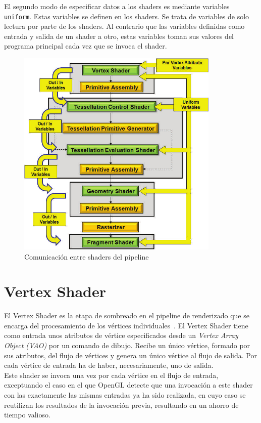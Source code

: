 El segundo modo de especificar datos a los shaders es mediante variables
\verb|uniform|. Estas variables se definen en los shaders. Se trata de variables
de solo lectura por parte de los shaders. Al contrario que las variables
definidas como entrada y salida de un shader a otro, estas variables toman sus
valores del programa principal cada vez que se invoca el shader.  \\

\begin{figure}
		\centering
		\includegraphics[height=10cm]{figures/variablespipe.png}
		\caption{Comunicación entre shaders del pipeline}
		\label{fig3.1}
\end{figure}

\section{Vertex Shader}
\label{ref:Vertex}

El Vertex Shader es la etapa de sombreado en el pipeline de renderizado que se
encarga del procesamiento de los vértices individuales~\cite{VertexShader}. El
Vertex Shader tiene como entrada unos atributos de vértice especificados desde
un \textit{Vertex Array Object (VAO)} por un comando de dibujo. Recibe un único
vértice, formado por sus atributos, del flujo de vértices y genera un único
vértice al flujo de salida. Por cada vértice de entrada ha de haber,
necesariamente, uno de salida. \\

Este shader se invoca una vez por cada vértice en el flujo de entrada,
exceptuando el caso en el que OpenGL detecte que una invocación a este shader
con las exactamente las mismas entradas ya ha sido realizada, en cuyo caso se
reutilizan los resultados de la invocación previa, resultando en un ahorro
de tiempo valioso. \\


